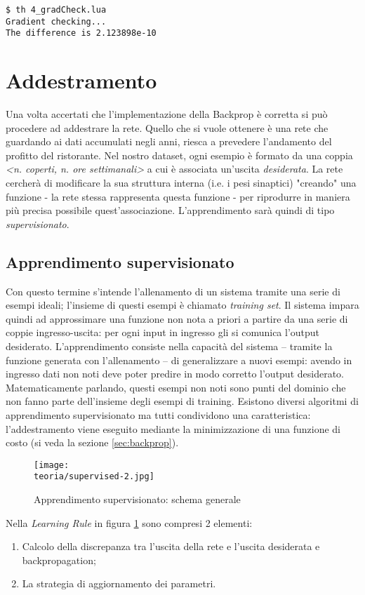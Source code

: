 \begin{lstlisting}
$ th 4_gradCheck.lua 
Gradient checking...	
The difference is 2.123898e-10	
\end{lstlisting}

\section{Addestramento}
\label{ref:training}
Una volta accertati che l'implementazione della Backprop è corretta si può procedere ad addestrare la rete. Quello che si vuole ottenere è una rete che guardando ai dati accumulati negli anni, riesca a prevedere l'andamento del profitto del ristorante. Nel nostro dataset, ogni esempio è formato da una coppia \emph{<n. coperti, n. ore settimanali>} a cui è associata un'uscita \emph{desiderata}. La rete cercherà di modificare la sua struttura interna (i.e. i pesi sinaptici) "creando" una funzione - la rete stessa rappresenta questa funzione - per riprodurre in maniera più precisa possibile quest'associazione. L'apprendimento sarà quindi di tipo \emph{supervisionato}.
\subsection{Apprendimento supervisionato}
\label{subsec:supervised}
Con questo termine s'intende l'allenamento di un sistema tramite una serie di esempi ideali; l'insieme di questi esempi è chiamato
\emph{training set}. Il sistema impara quindi ad approssimare una funzione non nota a priori a partire da una serie di coppie ingresso-uscita: per ogni input in ingresso gli si comunica l'output desiderato.
L'apprendimento consiste nella capacità del sistema – tramite la funzione generata con l'allenamento – di generalizzare a nuovi esempi: avendo in ingresso dati non noti deve poter predire in modo corretto l'output desiderato.
Matematicamente parlando, questi esempi non noti sono punti del dominio che non fanno parte dell'insieme degli esempi di training.
Esistono diversi algoritmi di apprendimento supervisionato ma tutti condividono una caratteristica: l'addestramento
viene eseguito mediante la minimizzazione di una funzione di costo (si veda la sezione \ref{sec:backprop}).
\begin{figure}[h!]
 \centering
 \texttt{[image: \\teoria/supervised-2.jpg]}
 \caption{Apprendimento supervisionato: schema generale}
 \label{fig:supervised}
\end{figure}
Nella \emph{Learning Rule} in figura \ref{fig:supervised} sono compresi 2 elementi: 
\begin{enumerate}
\item Calcolo della discrepanza tra l'uscita della rete e l'uscita desiderata e backpropagation;
\item La strategia di aggiornamento dei parametri.
\end{enumerate}

